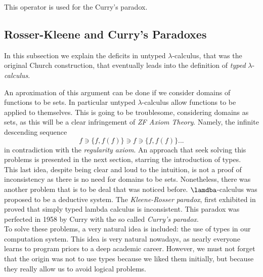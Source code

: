 This operator is used for the Curry's paradox.\\

\subsection{Rosser-Kleene and Curry's Paradoxes}

In this subsection we explain the deficits in untyped $\lambda$-calculus, that was the original Church construction, that eventually leads into the definition of \emph{typed} $\lambda$-\emph{calculus}.

An aproximation of this argument can be done if we consider domains of functions to be sets. In particular untyped $\lambda$-calculus allow functions to be applied to themselves. This is going to be troublesome, considering domains as sets, as this will be a clear infringement of \emph{ZF Axiom Theory}\cite{kunen2014set}. Namely, the infinite descending sequence
$$f\ni \{f,f(f)\}\ni f \ni \{f,f(f)\}...$$
in contradiction with the \emph{regularity axiom}. An approach that seek solving this problems is presented in the next section, starring the introduction of types.  \\

This last idea, despite being clear and loud to the intuition, is not a proof of inconsistency as there is no need for domains to be sets. Nonetheless, there was another problem that is to be deal that was noticed before. $\lamdba$-calculus was proposed to be a deductive system. The  \emph{Kleene-Rosser paradox}, first exhibited in \cite{kleene1935inconsistency} proved that simply typed lambda calculus is inconsistent. This paradox was perfected in 1958 by Curry \cite{curry1958combinatory} with the so called \emph{Curry's paradox}. \\

 To solve these problems, a very natural idea is included: the use of types in our computation system. This idea is very natural nowadays, as nearly everyone learns to program priors to a deep academic career. However, we must not forget that the origin was not to use types because we liked them initially, but because they really allow us to avoid logical problems.  


